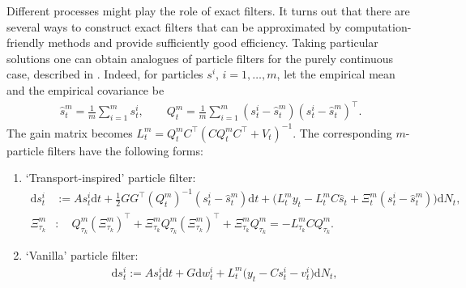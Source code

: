 \documentclass[12pt]{llncs}
\begin{document}
Different processes might play the role of exact filters. It turns out that there are several ways to construct exact filters that can be approximated by computation-friendly methods and provide sufficiently good efficiency. 
Taking particular solutions %
one can obtain analogues of particle filters for the purely continuous case, described in \cite{bishop}. Indeed, for particles $s^i$, $i=1,\ldots,m$, let the empirical mean and the empirical covariance be
\begin{subequations}
\begin{align}
 \widehat s^{m}_t = \frac{1}{m}\sum\limits_{i=1}^{m} s^i_t,
\qquad
  Q^{m}_t = \frac{1}{m}\sum\limits_{i=1}^{m} (s^i_t - \widehat s^{m}_t)(s^i_t - \widehat s^{m}_t)^\top.
\end{align}
\end{subequations}
The gain matrix becomes $L_t^{m} = Q_t^{m} C^\top (C Q_t^{m} C^\top + V_t)^{-1}.$
The corresponding $m$-particle filters have the following forms:
\begin{enumerate}

\item `Transport-inspired' particle filter:
\begin{align}
    \mathrm{d} s^i_t &:= A s^i_t \mathrm{d} t +  \frac{1}{2}GG^\top (Q^{m}_t)^{-1} (s^i_t-\widehat s^{m}_t) \mathrm{d} t
    +  \Big(L^{m}_t y_t - L^{m}_t C \widehat s_t +\Xi^{m}_t (s^i_t - \widehat s^{m}_t) \Big) \mathrm{d} N_t, 
    \label{eq:ch5: particles transport-insp}
    \\
    \Xi^{m}_{\tau_k} &: \quad Q^{m}_{\tau_k} (\Xi^{m}_{\tau_k})^\top + \Xi^{m}_{\tau_k} Q^{m}_{\tau_k} (\Xi^{m}_{\tau_k})^\top + \Xi^{m}_{\tau_k} Q^{m}_{\tau_k} = - L_{\tau_k}^{m} C Q^{m}_{\tau_k}.
    \label{eq:ch5: particles xi transport-insp}
\end{align} 
\item `Vanilla' particle filter:
\begin{align}
\label{eq:ch5: particles vanilla}
&\mathrm{d} s^i_t := A s^i_t \mathrm{d} t +  G  \mathrm{d} w^i_t 
    + L^{m}_t \Big(y_t - C s^i_t  - v^i_t \Big) \mathrm{d} N_t, %
\end{align} 
\end{enumerate}
\end{document}
